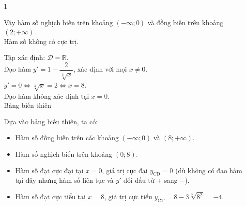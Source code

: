 \begin{vd}
{\begin{enumEX}[a)]{1}
\begin{center}
	\end{center}
	Vậy hàm số nghịch biến trên khoảng $(-\infty;0)$ và đồng biến trên khoảng $(2;+\infty)$.\\
	Hàm số không có cực trị.
	\item Tập xác định: $\mathscr{D}=\mathbb{R}$.\\
	Đạo hàm $y'=1-\dfrac{2}{\sqrt[3]{x}}$, xác định với mọi $x\neq 0$.\\
	$y'=0\Leftrightarrow \sqrt[3]{x}=2\Leftrightarrow x=8$.\\
	Đạo hàm không xác định tại $x=0$.\\
	Bảng biến thiên
	\begin{center}
	\end{center}
	Dựa vào bảng biến thiên, ta có:
	\begin{itemize}
		\item Hàm số đồng biến trên các khoảng $(-\infty; 0)$ và $(8; +\infty)$.
		\item Hàm số nghịch biến trên khoảng $(0; 8)$.
		\item Hàm số đạt cực đại tại $x = 0$, giá trị cực đại $y_{\text{CĐ}} = 0$ (dù không có đạo hàm tại đây nhưng hàm số liên tục và $y'$ đổi dấu từ $+$ sang $-$).
		\item Hàm số đạt cực tiểu tại $x = 8$, giá trị cực tiểu $y_{\text{CT}} = 8 - 3\sqrt[3]{8^2} = -4$.
	\end{itemize}
\end{enumEX}}
\end{vd}
